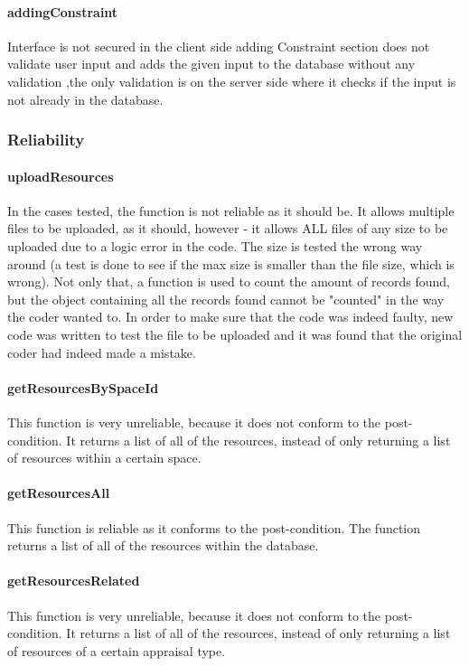 \documentclass[a4paper]{article}
\begin{document}
\paragraph{addingConstraint}
Interface is not secured in the client side adding Constraint section does not validate user input and adds the given input to the database without any validation ,the only validation is on the server side where it checks if the input is not already in the database.

\subsubsection {Reliability}

\paragraph{uploadResources}
In the cases tested, the function is not reliable as it should be. It allows multiple files to be uploaded, as it should, however - it allows ALL files of any size to be uploaded due to a logic error in the code. The size is tested the wrong way around (a test is done to see if the max size is smaller than the file size, which is wrong). Not only that, a function is used to count the amount of records found, but the object containing all the records found cannot be "counted" in the way the coder wanted to. In order to make sure that the code was indeed faulty, new code was written to test the file to be uploaded and it was found that the original coder had indeed made a mistake.

\paragraph{getResourcesBySpaceId}
This function is very unreliable, because it does not conform to the post-condition. It returns a list of all of the resources, instead of only returning a list of resources within a certain space.

\paragraph{getResourcesAll}
This function is reliable as it conforms to the post-condition. The function returns a list of all of the resources within the database.

\paragraph{getResourcesRelated}
This function is very unreliable, because it does not conform to the post-condition. It returns a list of all of the resources, instead of only returning a list of resources of a certain appraisal type.
\end{document}
